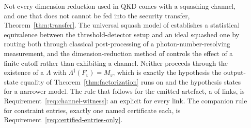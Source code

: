 
\begin{remark}\label{rem:notchannel}
Not every dimension reduction used in QKD comes with a squashing channel, and
one that does not cannot be fed into the security transfer,
Theorem~\ref{thm:transfer}. The universal squash model of
\cite[Sec.~II]{fung2011universal} establishes a statistical
equivalence between the threshold-detector setup and an ideal squashed one by
routing both through classical post-processing of a photon-number-resolving
measurement, and the dimension-reduction method of
\cite[Sec.~III]{upadhyaya2021dimension} controls the effect of a finite cutoff
rather than exhibiting a channel. Neither proceeds through the existence of a
$\Lambda$ with $\Lambda^{\dagger}(F_v)=M_v$, which is exactly the hypothesis the
output-state equality of Theorem~\ref{thm:factorization} runs on and the
hypothesis \cite[Lemma~6]{nahar2024postselection} states for a narrower model.
The rule that follows for the emitted artefact, a  of
links, is Requirement~\ref{req:channel-witness}: an explicit
 for every link. The companion rule for constraint
entries, exactly one named certificate each, is
Requirement~\ref{req:certified-entries-only}.
\end{remark}
